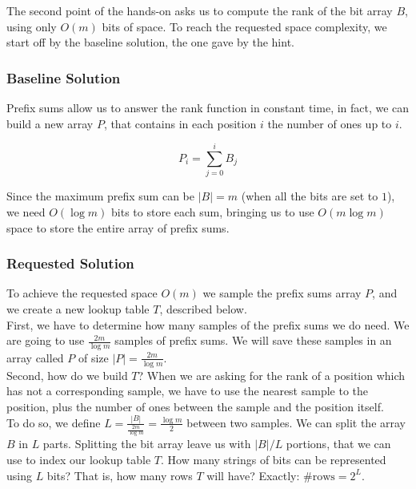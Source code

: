 \documentclass{article}
\begin{document}
The second point of the hands-on asks us to compute the rank of the bit array $B$, using only $O(m)$ bits of space. To reach the requested space complexity,
we start off by the baseline solution, the one gave by the hint.\\

\subsubsection{Baseline Solution}

\noindent Prefix sums allow us to answer the rank function in constant time, in fact, we can build a new array $P$, that contains in each position $i$ the number of ones
up to $i$.

\begin{equation}
    P_i = \sum_{j = 0}^{i} B_j
\end{equation}

\noindent Since the maximum prefix sum can be $|B| = m$ (when all the bits are set to $1$), we need $O(\log m)$ bits to store each sum, bringing us to use
$O(m \log m)$ space to store the entire array of prefix sums.\\

\subsubsection{Requested Solution}

\noindent To achieve the requested space $O(m)$ we sample the prefix sums array $P$, and we create a new lookup table $T$, described below.\\

\noindent First, we have to determine how many samples of the prefix sums we do need. We are going to use $\frac{2m}{\log m}$ samples of prefix sums. We will save
these samples in an array called $P$ of size $|P| = \frac{2m}{\log m}$.\\

\noindent Second, how do we build $T$? When we are asking for the rank of a position which has not a corresponding sample, 
we have to use the nearest sample to the position, plus the number of ones between the sample and the position itself.\\

\noindent To do so, we define $L = \frac{|B|}{\frac{2m}{\log m}} = \frac{\log m}{2}$ between two samples. We can split the array $B$ in $L$ parts.
Splitting the bit array leave us with $|B|/L$ portions, that we can use to index our lookup table $T$. 
How many strings of bits can be represented using $L$ bits? That is, how many rows $T$ will have? Exactly: $\#\textrm{rows} = 2^L$.
\end{document}
